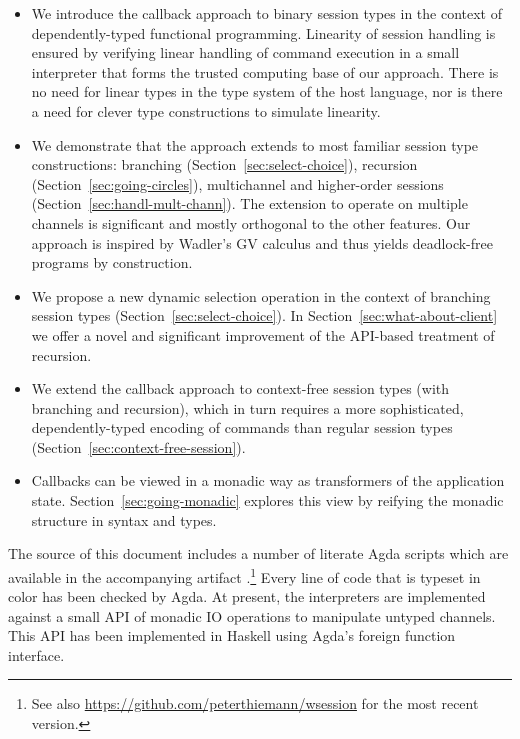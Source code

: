 \documentclass[acmsmall,screen]{acmart}
\begin{document}
\begin{itemize}
\item We introduce the callback approach to binary session
  types in the context of dependently-typed functional
  programming.
  Linearity of session handling is ensured by verifying linear
  handling of command execution in a small interpreter that forms the
  trusted computing base of our approach. There is no need for linear
  types in the type system of the host language, nor is there a need
  for clever type constructions to simulate linearity.
\item We demonstrate that the approach extends to most familiar
  session type constructions: branching
  (Section~\ref{sec:select-choice}), recursion
  (Section~\ref{sec:going-circles}), multichannel and
  higher-order sessions (Section~\ref{sec:handl-mult-chann}). 
  The extension to operate on multiple channels is significant and
  mostly orthogonal to the other features. Our approach is inspired by
  Wadler's GV calculus \cite{DBLP:journals/jfp/Wadler14} and thus
  yields deadlock-free programs by construction. 
\item We propose a new dynamic selection operation in the context of
  branching session types (Section~\ref{sec:select-choice}).
  In Section~\ref{sec:what-about-client} we offer a novel and significant
  improvement of the API-based treatment of recursion.
\item We extend the callback approach to context-free session types
  (with branching and recursion), which in turn requires a more
  sophisticated, dependently-typed encoding of commands than regular
  session types (Section~\ref{sec:context-free-session}).
\item Callbacks can be viewed in a monadic way as transformers of the
  application state. Section~\ref{sec:going-monadic} explores this
  view by reifying the monadic structure in syntax and types.
\end{itemize}

The source of this document includes a number of literate Agda
scripts which are available in the accompanying artifact \cite{thiemann_peter_2023_8164971}.\footnote{See
also \url{https://github.com/peterthiemann/wsession} for the most
recent version.} Every line 
of code that is typeset in color has been checked by Agda. At present,
the interpreters are implemented against a small API of monadic IO
operations to manipulate untyped channels. This API has been
implemented in Haskell using Agda's foreign function interface.
\end{document}
